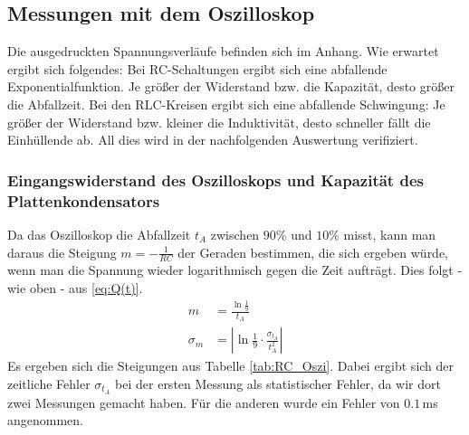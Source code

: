 \documentclass[12pt,a4paper,titlepage,headinclude,bibtotoc]{scrartcl}
\begin{document}
\subsection{Messungen mit dem Oszilloskop}
Die ausgedruckten Spannungsverläufe befinden sich im Anhang.
Wie erwartet ergibt sich folgendes:
Bei RC-Schaltungen ergibt sich eine abfallende Exponentialfunktion.
Je größer der Widerstand bzw. die Kapazität, desto größer die Abfallzeit.
Bei den RLC-Kreisen ergibt sich eine abfallende Schwingung:
Je größer der Widerstand bzw. kleiner die Induktivität, desto schneller fällt die Einhüllende ab.
All dies wird in der nachfolgenden Auswertung verifiziert.  

\subsubsection{Eingangswiderstand des Oszilloskops und Kapazität des Plattenkondensators}
Da das Oszilloskop die Abfallzeit $t_A$ zwischen $90\%$ und $10\%$ misst, kann man daraus die Steigung $m=-\frac{1}{RC}$ der Geraden bestimmen, die sich ergeben würde, wenn man die Spannung wieder logarithmisch gegen die Zeit aufträgt. Dies folgt - wie oben - aus \eqref{eq:Q(t)}.
\begin{align*}
	m&=\frac{\ln\frac{1}{9}}{t_A}\\
	\sigma_m&=\left|\ln\frac{1}{9}\cdot \frac{\sigma_{t_A}}{t_A^2}\right|
\end{align*}
Es ergeben sich die Steigungen aus Tabelle \ref{tab:RC_Oszi}.
Dabei ergibt sich der zeitliche Fehler $\sigma_{t_A}$ bei der ersten Messung als statistischer Fehler, da wir dort zwei Messungen gemacht haben.
Für die anderen wurde ein Fehler von $0.1\,$ms angenommen.
\end{document}
